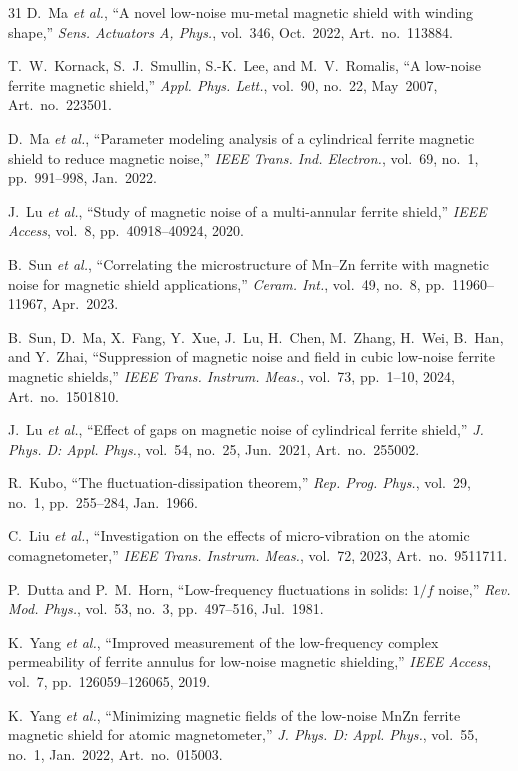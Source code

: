 ﻿\documentclass[letterpaper,journal]{IEEEtran}
\begin{document}
\begin{thebibliography}{31}
D.~Ma \textit{et al.},
``A novel low-noise mu-metal magnetic shield with winding shape,''
\textit{Sens. Actuators A, Phys.}, vol.~346, Oct.~2022, Art.~no.~113884.

T.~W.~Kornack, S.~J.~Smullin, S.-K.~Lee, and M.~V.~Romalis,
``A low-noise ferrite magnetic shield,''
\textit{Appl. Phys. Lett.}, vol.~90, no.~22, May~2007, Art.~no.~223501.

D.~Ma \textit{et al.},
``Parameter modeling analysis of a cylindrical ferrite magnetic shield to reduce magnetic noise,''
\textit{IEEE Trans. Ind. Electron.}, vol.~69, no.~1, pp.~991--998, Jan.~2022.

J.~Lu \textit{et al.},
``Study of magnetic noise of a multi-annular ferrite shield,''
\textit{IEEE Access}, vol.~8, pp.~40918--40924, 2020.

B.~Sun \textit{et al.},
``Correlating the microstructure of Mn--Zn ferrite with magnetic noise for magnetic shield applications,''
\textit{Ceram. Int.}, vol.~49, no.~8, pp.~11960--11967, Apr.~2023.

B.~Sun, D.~Ma, X.~Fang, Y.~Xue, J.~Lu, H.~Chen, M.~Zhang, H.~Wei, B.~Han, and Y.~Zhai,
``Suppression of magnetic noise and field in cubic low-noise ferrite magnetic shields,''
\textit{IEEE Trans. Instrum. Meas.}, vol.~73, pp.~1--10, 2024, Art.~no.~1501810.

J.~Lu \textit{et al.},
``Effect of gaps on magnetic noise of cylindrical ferrite shield,''
\textit{J. Phys. D: Appl. Phys.}, vol.~54, no.~25, Jun.~2021, Art.~no.~255002.

R.~Kubo,
``The fluctuation-dissipation theorem,''
\textit{Rep. Prog. Phys.}, vol.~29, no.~1, pp.~255--284, Jan.~1966.

C.~Liu \textit{et al.},
``Investigation on the effects of micro-vibration on the atomic comagnetometer,''
\textit{IEEE Trans. Instrum. Meas.}, vol.~72, 2023, Art.~no.~9511711.

P.~Dutta and P.~M.~Horn,
``Low-frequency fluctuations in solids: $1/f$ noise,''
\textit{Rev. Mod. Phys.}, vol.~53, no.~3, pp.~497--516, Jul.~1981.

K.~Yang \textit{et al.},
``Improved measurement of the low-frequency complex permeability of ferrite annulus for low-noise magnetic shielding,''
\textit{IEEE Access}, vol.~7, pp.~126059--126065, 2019.

K.~Yang \textit{et al.},
``Minimizing magnetic fields of the low-noise MnZn ferrite magnetic shield for atomic magnetometer,''
\textit{J. Phys. D: Appl. Phys.}, vol.~55, no.~1, Jan.~2022, Art.~no.~015003.


\end{thebibliography}
\end{document}
